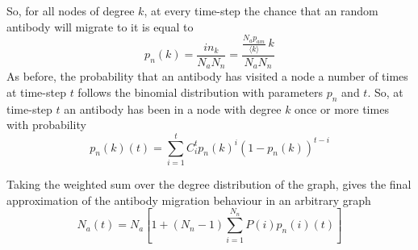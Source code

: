 \documentclass{article}
\begin{document}
So, for all nodes of degree $k$, at every time-step the chance that an random antibody will migrate to it is equal to
$$
   p_n(k) = \frac{in_k}{N_a N_n} = \frac{\frac{ N_a p_{am}}{\langle k \rangle} ~ k}{N_a N_n}
$$
As before, the probability that an antibody has visited a node a number of times at time-step $t$ follows the binomial distribution with parameters $p_n$ and $t$.
So, at time-step $t$ an antibody has been in a node with degree $k$ once or more times with probability
\begin{equation}
  p_n(k)(t) = \sum_{i=1}^{t} C_i^t p_n(k)^i (1-p_n(k))^{t-i}
\end{equation}

Taking the weighted sum over the degree distribution of the graph, gives the final approximation of the antibody migration behaviour in an arbitrary graph
\begin{equation}
  \label{eq_general_am}
  N_a(t) = N_a [ 1 + (N_n - 1) \sum_{i=1}^{N_n}{P(i) p_n(i)(t)}]
\end{equation}





\end{document}
